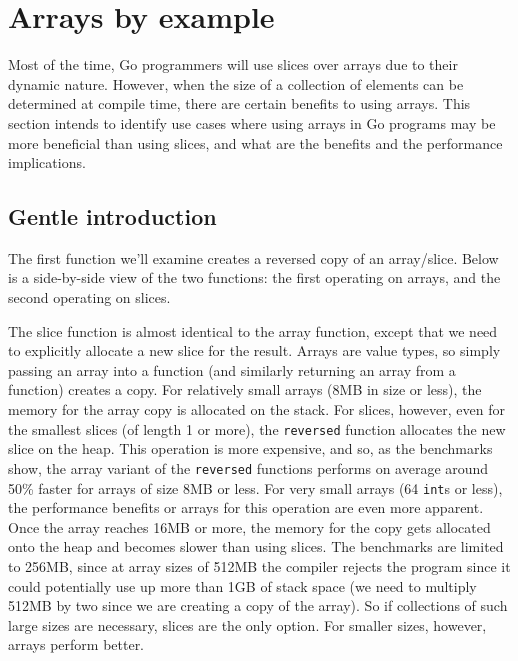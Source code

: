 \section{Arrays by example}
\label{ch:examples}

Most of the time, Go programmers will use slices over arrays due to their
dynamic nature. However, when the size of a collection of elements can be
determined at compile time, there are certain benefits to using arrays. This
section intends to identify use cases where using arrays in Go programs may be
more beneficial than using slices, and what are the benefits and the performance
implications.

\subsection{Gentle introduction}

The first function we'll examine creates a reversed copy of an array/slice.
Below is a side-by-side view of the two functions: the first operating on
arrays, and the second operating on slices.


The slice function is almost identical to the array function, except that we
need to explicitly allocate a new slice for the result. Arrays are value types,
so simply passing an array into a function (and similarly returning an array
from a function) creates a copy. For relatively small arrays (8MB in size or
less), the memory for the array copy is allocated on the stack. For slices,
however, even for the smallest slices (of length 1 or more), the
\texttt{reversed} function allocates the new slice on the heap. This operation
is more expensive, and so, as the benchmarks show, the array variant of the
\texttt{reversed} functions performs on average around 50\% faster for arrays of
size 8MB or less. For very small arrays (64 \texttt{int}s or less), the
performance benefits or arrays for this operation are even more apparent. Once
the array reaches 16MB or more, the memory for the copy gets allocated onto the
heap and becomes slower than using slices. The benchmarks are limited to 256MB,
since at array sizes of 512MB the compiler rejects the program since it could
potentially use up more than 1GB of stack space (we need to multiply 512MB by
two since we are creating a copy of the array). So if collections of such large
sizes are necessary, slices are the only option. For smaller sizes, however,
arrays perform better.

